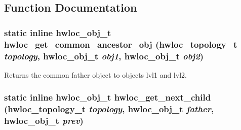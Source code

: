 \subsection{Function Documentation}
\hypertarget{group__hwlocality__helper__traversal__basic_ga58ba3d31ed79e7a1a47909824489d317}{
\subsubsection[{hwloc\_\-get\_\-common\_\-ancestor\_\-obj}]{\setlength{\rightskip}{0pt plus 5cm}static inline {\bf hwloc\_\-obj\_\-t} hwloc\_\-get\_\-common\_\-ancestor\_\-obj ({\bf hwloc\_\-topology\_\-t} {\em topology}, \/  {\bf hwloc\_\-obj\_\-t} {\em obj1}, \/  {\bf hwloc\_\-obj\_\-t} {\em obj2})}}
\label{group__hwlocality__helper__traversal__basic_ga58ba3d31ed79e7a1a47909824489d317}


Returns the common father object to objects lvl1 and lvl2. \hypertarget{group__hwlocality__helper__traversal__basic_ga3727d1e62843468ad3796fae52881512}{
\subsubsection[{hwloc\_\-get\_\-next\_\-child}]{\setlength{\rightskip}{0pt plus 5cm}static inline {\bf hwloc\_\-obj\_\-t} hwloc\_\-get\_\-next\_\-child ({\bf hwloc\_\-topology\_\-t} {\em topology}, \/  {\bf hwloc\_\-obj\_\-t} {\em father}, \/  {\bf hwloc\_\-obj\_\-t} {\em prev})}}
\label{group__hwlocality__helper__traversal__basic_ga3727d1e62843468ad3796fae52881512}


